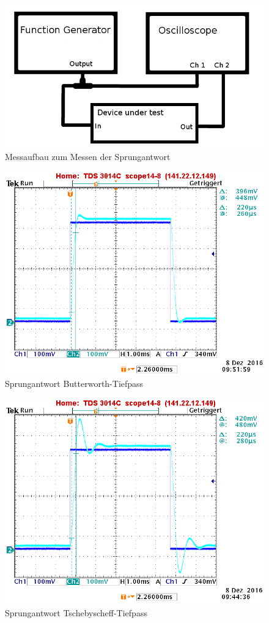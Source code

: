 \begin{figure}[h]
\centering
\includegraphics[width=0.7\linewidth]{Bilder/Messaufbau_Oszi}
\caption{Messaufbau zum Messen der Sprungantwort}
\label{fig:Messaufbau_Oszi}
\end{figure}


\begin{figure}[h]
\centering
\includegraphics[width=0.7\linewidth]{Bilder/ImLabor/Sprungantwort_5_8_Butter_Anstiegszeit}
\caption{Sprungantwort Butterworth-Tiefpass}
\label{fig:Sprungantwort_5_8_Butter_Anstiegszeit}
\end{figure}

\begin{figure}[h]
\centering
\includegraphics[width=0.7\linewidth]{Bilder/ImLabor/Sprungantwort_5_3_Tscheby_Anstiegszeit}
\caption{Sprungantwort Tschebyscheff-Tiefpass}
\label{fig:Sprungantwort_5_3_Tscheby_Anstiegszeit}
\end{figure}

